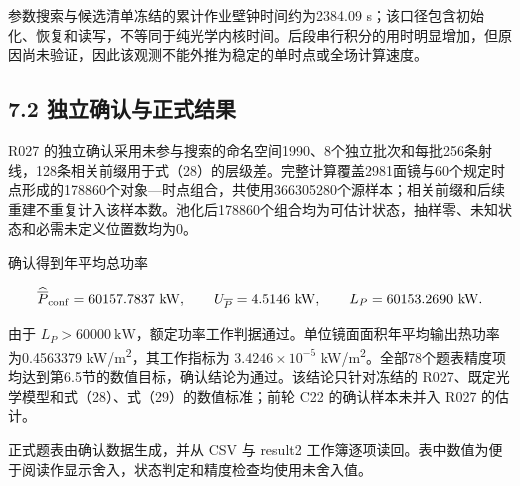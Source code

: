 \documentclass[UTF8,fontset=windows,zihao=-4]{ctexart}
\begin{document}
参数搜索与候选清单冻结的累计作业壁钟时间约为2384.09 s；该口径包含初始化、恢复和读写，不等同于纯光学内核时间。后段串行积分的用时明显增加，但原因尚未验证，因此该观测不能外推为稳定的单时点或全场计算速度。

\subsection*{7.2 独立确认与正式结果}

R027 的独立确认采用未参与搜索的命名空间1990、8个独立批次和每批256条射线，128条相关前缀用于式（28）的层级差。完整计算覆盖2981面镜与60个规定时点形成的178860个对象—时点组合，共使用366305280个源样本；相关前缀和后续重建不重复计入该样本数。池化后178860个组合均为可估计状态，抽样零、未知状态和必需未定义位置数均为0。

\par\noindent\begin{minipage}{\linewidth}
确认得到年平均总功率

\[
\widehat{\overline P}_{\rm conf}=60157.7837\ \mathrm{kW},
\qquad
U_{\overline P}=4.5146\ \mathrm{kW},
\qquad
L_P=60153.2690\ \mathrm{kW}.
\]
\end{minipage}\par

由于 \(L_P>60000\ \mathrm{kW}\)，额定功率工作判据通过。单位镜面面积年平均输出热功率为0.4563379 kW/m\textsuperscript{2}，其工作指标为 \(3.4246\times10^{-5}\) kW/m\textsuperscript{2}。全部78个题表精度项均达到第6.5节的数值目标，确认结论为通过。该结论只针对冻结的 R027、既定光学模型和式（28）、式（29）的数值标准；前轮 C22 的确认样本未并入 R027 的估计。

正式题表由确认数据生成，并从 CSV 与 result2 工作簿逐项读回。表中数值为便于阅读作显示舍入，状态判定和精度检查均使用未舍入值。
\end{document}
